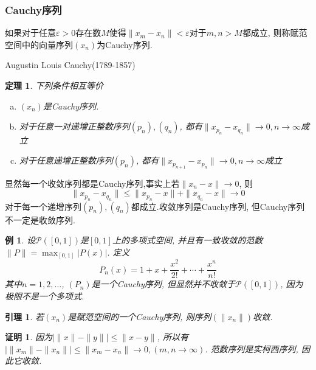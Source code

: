 \documentclass[a4paper,11pt]{article}
\theoremstyle{mystyle}
\newtheorem{theorem}{\hspace{2em}定理}[section]
\newtheorem{lemma}{\hspace{2em}引理}[section]
\newtheorem{Proof}{\hspace{2em}证明}[section]
\newtheorem{example}{\hspace{2em}例}[section]
\begin{document}
\subsubsection*{Cauchy序列}
\begin{definition}
  如果对于任意$\varepsilon>0$存在数$M$使得$\|x_m-x_n\|<\varepsilon$对于$m,n>M$都成立, 则称赋范空间中的向量序列$(x_n)$为Cauchy序列.
\end{definition}
Augustin Louis Cauchy(1789-1857)
\begin{theorem}
  下列条件相互等价
  \begin{enumerate}[(a)]
    \item $(x_n)$是Cauchy序列.
    \item 对于任意一对递增正整数序列$(p_n),(q_n)$, 都有$\|x_{p_n}-x_{q_n}\|\to0,n\to\infty$成立
    \item 对于任意递增正整数序列$(p_n)$, 都有$\|x_{p_{n+1}}-x_{p_n}\|\to0,n\to\infty$成立
  \end{enumerate}
\end{theorem}
显然每一个收敛序列都是Cauchy序列,事实上若$\|x_n-x\|\to0$, 则
\begin{equation*}
  \|x_{p_n}-x_{q_n}\|\leq\|x_{p_n}-x\|+\|x_{q_n}-x\|\to0
\end{equation*}
对于每一个递增序列$(p_n),(q_n)$都成立.收敛序列是Cauchy序列, 但Cauchy序列不一定是收敛序列.
\begin{example}
  设$\mathcal{P}([0,1])$是$[0,1]$上的多项式空间, 并且有一致收敛的范数$\|P\|=\max_{[0,1]}|P(x)|$. 定义
  \begin{equation*}
    P_n(x)=1+x+\frac{x^2}{2!}+\cdots+\frac{x^n}{n!}
  \end{equation*}
  其中$n=1,2,\dots$, $(P_n)$是一个Cauchy序列, 但显然并不收敛于$\mathcal{P}([0,1])$, 因为极限不是一个多项式.
\end{example}
\begin{lemma}
  若$(x_n)$是赋范空间的一个Cauchy序列, 则序列$(\|x_n\|)$收敛.
\end{lemma}
\begin{Proof}
  因为$|\|x\|-\|y\||\leq\|x-y\|$, 所以有$|\|x_m\|-\|x_n\||\leq\|x_m-x_n\|\to0,(m,n\to \infty)$. 范数序列是实柯西序列, 因此它收敛.
\end{Proof}
\end{document}
